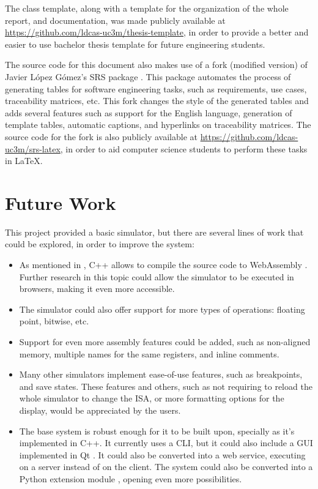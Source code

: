 The class template, along with a template for the organization of the whole report, and documentation, was made publicly available at \url{https://github.com/ldcas-uc3m/thesis-template}, in order to provide a better and easier to use bachelor thesis template for future engineering students.

The source code for this document also makes use of a fork (modified version) of Javier López Gómez's SRS package \parencite{SRSpackage}. This package automates the process of generating tables for \gls{software engineering} tasks, such as requirements, use cases, traceability matrices, etc. This fork changes the style of the generated tables and adds several features such as support for the English language, generation of template tables, automatic captions, and hyperlinks on traceability matrices. The source code for the fork is also publicly available at \url{https://github.com/ldcas-uc3m/srs-latex}, in order to aid computer science students to perform these tasks in \LaTeX.



\section{Future Work}\label{sec:future-work}
This project provided a basic simulator, but there are several lines of work that could be explored, in order to improve the system:
\begin{itemize}
  \item As mentioned in , C++ allows to compile the source code to WebAssembly \parencite{HaasAndreas2017Btwu}. Further research in this topic could allow the simulator to be executed in browsers, making it even more accessible.
  \item The simulator could also offer support for more types of operations: floating point, bitwise, etc.
  \item Support for even more \gls{assembly} features could be added, such as non-aligned memory, multiple names for the same registers, and inline comments.
  \item Many other simulators implement ease-of-use features, such as breakpoints, and save states. These features and others, such as not requiring to reload the whole simulator to change the \gls{ISA}, or more formatting options for the display, would be appreciated by the users.
  \item The base system is robust enough for it to be built upon, specially as it's implemented in C++. It currently uses a \gls{CLI}, but it could also include a \gls{GUI} implemented in Qt \parencite{QtFramework}. It could also be converted into a \gls{web service}, executing on a server instead of on the client. The system could also be converted into a Python extension module \parencite{pythonExtension}, opening even more possibilities.
\end{itemize}

